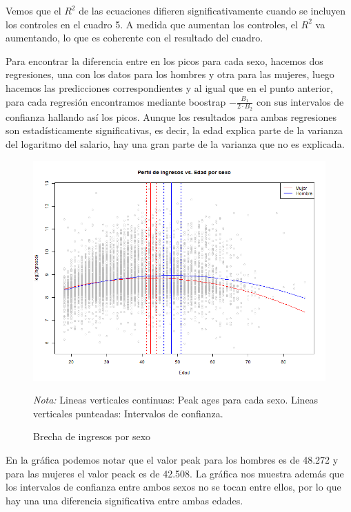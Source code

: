 Vemos que el $R^2$ de las ecuaciones difieren significativamente cuando se incluyen los controles en el cuadro 5. A medida que aumentan los controles, el $R^2$ va aumentando, lo que es coherente con el resultado del cuadro.

Para encontrar la diferencia entre en los picos para cada sexo, hacemos dos regresiones, una con los datos para los hombres y otra para las mujeres, luego hacemos las predicciones correspondientes y al igual que en el punto anterior, para cada regresión encontramos mediante boostrap $-\frac{B_1}{2 \cdot B_2}$ con sus intervalos de confianza hallando así los picos. Aunque los resultados para ambas regresiones son estadísticamente significativas, es decir, la edad explica parte de la varianza del logaritmo del salario, hay una gran parte de la varianza que no es explicada.

\begin{figure}[H]
\caption{Brecha de ingresos por sexo}
\label{gen_gap}
\centering
\includegraphics[scale=0.6]{Imagenes/earnings_gen_gap.png}
\scriptsize{\begin{flushleft}\textit{Nota:} Lineas verticales continuas: Peak ages para cada sexo. Lineas verticales punteadas: Intervalos de confianza.  \end{flushleft} }
\end{figure}

En la gráfica podemos notar que el valor peak para los hombres es de 48.272 y para las mujeres el valor peack es de 42.508. La gráfica nos muestra además que los intervalos de confianza entre ambos sexos no se tocan entre ellos, por lo que hay una una diferencia significativa entre ambas edades.

